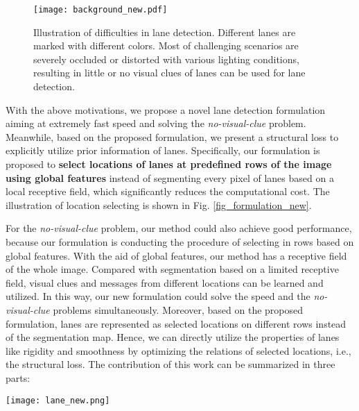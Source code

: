 \documentclass[runningheads]{llncs}
\begin{document}
\begin{figure}[t]
	\centering
	\texttt{[image: background\_new.pdf]}
	\caption{Illustration of difficulties in lane detection. Different lanes are marked with different colors. Most of challenging scenarios are severely occluded or distorted with various lighting conditions, resulting in little or no visual clues of lanes can be used for lane detection.}
	\label{figure_intro}
	\vspace{-20pt}
\end{figure}

With the above motivations, we propose a novel lane detection formulation aiming at extremely fast speed and solving the \textit{no-visual-clue} problem. Meanwhile, based on the proposed formulation, we present a structural loss to explicitly utilize prior information of lanes.
Specifically, our formulation is proposed to \textbf{select locations of lanes at predefined rows of the image using global features} instead of segmenting every pixel of lanes based on a local receptive field, which significantly reduces the computational cost. The illustration of location selecting is shown in Fig. \ref{fig_formulation_new}.

For the \textit{no-visual-clue} problem, our method could also achieve good performance, because our formulation is conducting the procedure of selecting in rows based on global features. With the aid of global features, our method has a receptive field of the whole image. Compared with segmentation based on a limited receptive field, visual clues and messages from different locations can be learned and utilized. In this way, our new formulation could solve the speed and the \textit{no-visual-clue} problems simultaneously. Moreover, based on the proposed formulation, lanes are represented as selected locations on different rows instead of the segmentation map. Hence, we can directly utilize the properties of lanes like rigidity and smoothness by optimizing the relations of selected locations, i.e., the structural loss. The contribution of this work can be summarized in three parts:


\begin{figure*}[t]
	\centering
	\texttt{[image: lane\_new.png]}
\caption{Illustration of selecting on the left and right lane. In the right part, the selecting of a row is shown in detail. Row anchors are the predefined row locations, and our formulation is defined as horizontally selecting on each of row anchor. On the right of the image, a background gridding cell is introduced to indicate no lane in this row.}
	\label{fig_formulation_new}
\vspace{-10pt}
\end{figure*}
\end{document}
